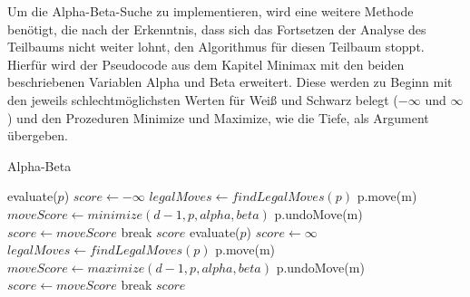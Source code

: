 Um die Alpha-Beta-Suche zu implementieren, wird eine weitere Methode benötigt, die nach der Erkenntnis, dass sich das Fortsetzen der Analyse des Teilbaums nicht weiter lohnt, den Algorithmus für diesen Teilbaum stoppt.
Hierfür wird der Pseudocode aus dem Kapitel Minimax mit den beiden beschriebenen Variablen Alpha und Beta erweitert.
Diese werden zu Beginn mit den jeweils schlechtmöglichsten Werten für Weiß und Schwarz belegt ($-\infty$ und $\infty$) und den Prozeduren Minimize und Maximize, wie die Tiefe, als Argument übergeben.

\begin{algorithm}
    \caption{Alpha-Beta}
    \begin{algorithmic}[1]
        \State \Return evaluate($p$)
        \Else
        \State $score \gets -\infty$
        \State $legalMoves \gets findLegalMoves(p)$
        \State p.move(m)
        \State $moveScore \gets minimize(d-1, p, alpha, beta)$
        \State p.undoMove(m)
        \State $score \gets moveScore$
        \EndIf
        \State break
        \EndIf
        \EndFor
        \EndIf
        \State \Return $score$
        \EndFunction
        \State \Return evaluate($p$)
        \Else
        \State $score \gets \infty$
        \State $legalMoves \gets findLegalMoves(p)$
        \State p.move(m)
        \State $moveScore \gets maximize(d-1, p, alpha, beta)$
        \State p.undoMove(m)
        \State $score \gets moveScore$
        \EndIf
        \State break
        \EndIf
        \EndFor
        \EndIf
        \State \Return $score$
        \EndFunction
    \end{algorithmic}
\end{algorithm}
\newpage


